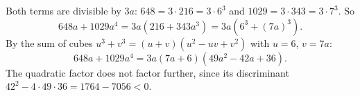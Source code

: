 Both terms are divisible by $3a$: $648=3\cdot216=3\cdot6^3$ and $1029=3\cdot343=3\cdot7^3$. So
\[
648a+1029a^4=3a\left(216+343a^3\right)=3a\left(6^3+(7a)^3\right).
\]
By the sum of cubes $u^3+v^3=(u+v)(u^2-uv+v^2)$ with $u=6$, $v=7a$:
\[
648a+1029a^4=\boxed{3a(7a+6)(49a^2-42a+36)} .
\]
The quadratic factor does not factor further, since its discriminant $42^2-4\cdot49\cdot36=1764-7056<0$.
